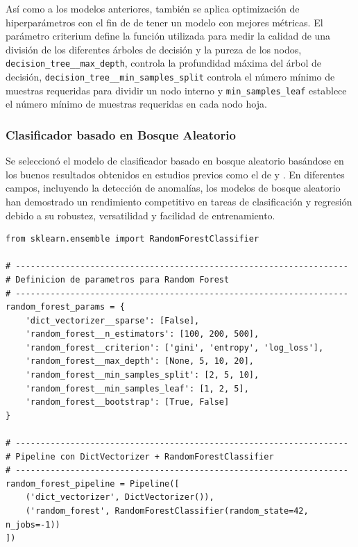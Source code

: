 \documentclass[11pt,a4paper,spanish]{book}
\numberwithin{equation}{chapter}
\numberwithin{figure}{chapter}
\begin{document}
Así como a los modelos anteriores, también se aplica optimización de hiperparámetros 
con el fin de  de tener un modelo con mejores métricas. El parámetro criterium define 
la función utilizada para medir la calidad de una división de los diferentes árboles de 
decisión y la pureza de los nodos, \lstinline|decision_tree__max_depth|, controla la 
profundidad máxima del árbol de decisión, \lstinline|decision_tree__min_samples_split|  
controla el número mínimo de muestras requeridas para dividir un nodo interno y 
\lstinline|min_samples_leaf| establece el número mínimo de muestras requeridas en 
cada nodo hoja. 


\subsubsection{Clasificador basado en Bosque Aleatorio}

Se seleccionó el modelo de clasificador basado en bosque aleatorio basándose en los 
buenos resultados obtenidos en estudios previos como el de \cite{canovas2017random} 
y \cite{yu2025tkeo}. En diferentes campos, incluyendo la detección de anomalías, 
los modelos de bosque aleatorio han demostrado un rendimiento competitivo en tareas 
de clasificación y regresión debido a su robustez, versatilidad y facilidad de 
entrenamiento. 


\vspace{5mm}
\begin{lstlisting}
from sklearn.ensemble import RandomForestClassifier

# -------------------------------------------------------------------
# Definicion de parametros para Random Forest
# -------------------------------------------------------------------
random_forest_params = {
    'dict_vectorizer__sparse': [False],
    'random_forest__n_estimators': [100, 200, 500],   
    'random_forest__criterion': ['gini', 'entropy', 'log_loss'],
    'random_forest__max_depth': [None, 5, 10, 20],
    'random_forest__min_samples_split': [2, 5, 10],
    'random_forest__min_samples_leaf': [1, 2, 5],
    'random_forest__bootstrap': [True, False]
}

# -------------------------------------------------------------------
# Pipeline con DictVectorizer + RandomForestClassifier
# -------------------------------------------------------------------
random_forest_pipeline = Pipeline([
    ('dict_vectorizer', DictVectorizer()),
    ('random_forest', RandomForestClassifier(random_state=42, n_jobs=-1))
])
\end{lstlisting}
\end{document}
